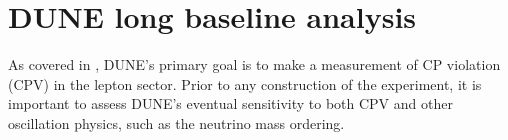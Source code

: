 \chapter{DUNE long baseline analysis}
\label{sec:dune_lbl}

As covered in , DUNE's primary goal is to make a measurement of CP violation (CPV) in the lepton sector.
Prior to any construction of the experiment, it is important to assess DUNE's eventual sensitivity to both CPV and other oscillation physics, such as the neutrino mass ordering.

